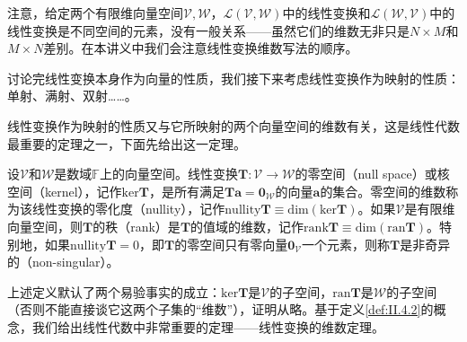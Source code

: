 \documentclass[main.tex]{subfiles}
\begin{document}
注意，给定两个有限维向量空间$\mathcal{V},\mathcal{W}$，$\mathcal{L}\left(\mathcal{V},\mathcal{W}\right)$中的线性变换和$\mathcal{L}\left(\mathcal{W},\mathcal{V}\right)$中的线性变换是不同空间的元素，没有一般关系——虽然它们的维数无非只是$N\times M$和$M\times N$差别。在本讲义中我们会注意线性变换维数写法的顺序。

讨论完线性变换本身作为向量的性质，我们接下来考虑线性变换作为映射的性质：单射、满射、双射……。

线性变换作为映射的性质又与它所映射的两个向量空间的维数有关，这是线性代数最重要的定理之一，下面先给出这一定理。

\begin{definition}\label{def:II.4.2}
设$\mathcal{V}$和$\mathcal{W}$是数域$\mathbb{F}$上的向量空间。线性变换$\mathbf{T}:\mathcal{V}\rightarrow\mathcal{W}$的零空间（null space）或核空间（kernel），记作$\mathrm{ker}\mathbf{T}$，是所有满足$\mathbf{Ta}=\mathbf{0}_\mathcal{W}$的向量$\mathbf{a}$的集合。零空间的维数称为该线性变换的零化度（nullity），记作$\mathrm{nullity}\mathbf{T}\equiv\mathrm{dim}\left(\mathrm{ker}\mathbf{T}\right)$。如果$\mathcal{V}$是有限维向量空间，则$\mathbf{T}$的秩（rank）是$\mathbf{T}$的值域的维数，记作$\mathrm{rank}\mathbf{T}\equiv\mathrm{dim}\left(\mathrm{ran}\mathbf{T}\right)$。特别地，如果$\mathrm{nullity}\mathbf{T}=0$，即$\mathbf{T}$的零空间只有零向量$\mathbf{0}_\mathcal{V}$一个元素，则称$\mathbf{T}$是非奇异的（non-singular）。
\end{definition}

上述定义默认了两个易验事实的成立：$\mathrm{ker}\mathbf{T}$是$\mathcal{V}$的子空间，$\mathrm{ran}\mathbf{T}$是$\mathcal{W}$的子空间（否则不能直接谈它这两个子集的“维数”），证明从略\cite[\S7.3“2.线性变换的简单性质(4)”p.~177]{周胜林2012线性代数}。基于定义\ref{def:II.4.2}的概念，我们给出线性代数中非常重要的定理——线性变换的维数定理\cite[\S7.3“2.线性变换的简单性质(5)”p.~178]{周胜林2012线性代数}。
\end{document}
